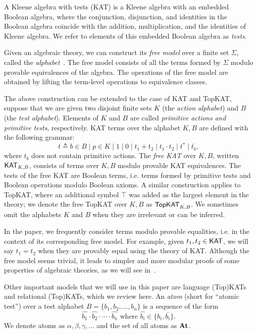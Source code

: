 A Kleene algebra with tests (KAT) is a Kleene algebra with an embedded Boolean algebra,
where the conjunction, disjunction, and identities in the Boolean algebra coincide with 
the addition, multiplication, and the identities of Kleene algebra.  
We refer to elements of this embedded Boolean algebra as \emph{tests}.

Given an algebraic theory, we can construct its \emph{free model} 
over a finite set \( \Sigma \), 
called the \emph{alphabet}~\cite{burrisCourseUniversalAlgebra1981}.  
The free model consists of all the terms formed by \( \Sigma \) modulo 
provable equivalences of the algebra. The operations of the free model are obtained 
by lifting the term-level operations to equivalence classes.

The above construction can be extended to the case of KAT and TopKAT, 
suppose that we are given two disjoint finite sets $K$ (the
\emph{action alphabet}) and $B$ (the \emph{test alphabet}).  Elements of $K$ and
$B$ are called \emph{primitive actions and primitive tests}, respectively. 
KAT terms over the alphabet \(K, B\) are defined with the following grammar:
\[t  \triangleq  b  \in  B  \mid  p  \in  K  \mid  1  \mid  0  \mid  t_{1} + t_{2}  \mid  t_{1}  \cdot  t_{2}  \mid  t^*  \mid  \overline{t_b},\]
where \(t_b\) does not contain primitive actions.
The \emph{free KAT} over \(K, B\), written $\mathsf{KAT}_{K,B}$, 
consists of terms over \(K, B\) modulo provable KAT equivalences.  
The tests of the free KAT are Boolean terms, i.e. terms formed by
primitive tests and Boolean operations modulo Boolean axioms.  A similar
construction applies to TopKAT, where an additional symbol \( \top \) was added 
as the largest element in the theory; we denote the free TopKAT over $K,B$ as
\(\mathsf{TopKAT}_{K, B}\).  We sometimes omit the alphabets \(K\) and \(B\) when they
are irrelevant or can be inferred.

In the paper, we frequently consider terms modulo provable equalities, i.e. in the
context of its corresponding free model.  For example, given \(t_{1}, t_{2}  \in  \mathsf{KAT}\),
we will say \(t_{1} = t_{2}\) when they are provably equal using the theory of KAT.
Although the free model seems trivial, it leads to simpler and more modular
proofs of some properties of algebraic theories, as we will see in~.

Other important models that we will use in this paper are language (Top)KATs and
relational (Top)KATs, which we review here.  An \emph{atom} (short for ``atomic
test'') over a test alphabet \(B = \{b_{1}, b_{2},  \ldots , b_{n}\}\) is a sequence of the form
\[\hat{b_{1}}  \cdot  \hat{b_{2}}  \cdot   \cdots   \cdot \hat{b_{n}} \text{ where } \hat{b_{i}}  \in  \{b_{i}, \bar{b_{i}}\}.\] 
We denote atoms as \( \alpha ,  \beta ,  \gamma ,  \ldots \) and the set of all atoms as \(\mathbf{At}\).

